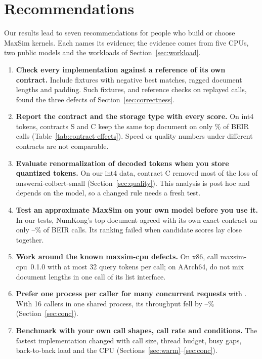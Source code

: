 \section{Recommendations}
\label{sec:recs}

Our results lead to seven recommendations for people who build or choose MaxSim kernels.
Each names its evidence; the evidence comes from five CPUs, two public models and the workloads of Section~\ref{sec:workload}.

\begin{enumerate}
\item \textbf{Check every implementation against a reference of its own contract.} Include fixtures with negative best matches, ragged document lengths and padding. Such fixtures, and reference checks on replayed calls, found the three defects of Section~\ref{sec:correctness}.
\item \textbf{Report the contract and the storage type with every score.} On int4 tokens, contracts S and C keep the same top document on only \% of BEIR calls (Table~\ref{tab:contract-effects}). Speed or quality numbers under different contracts are not comparable.
\item \textbf{Evaluate renormalization of decoded tokens when you store quantized tokens.} On our int4 data, contract C removed most of the loss of answerai-colbert-small (Section~\ref{sec:quality}). This analysis is post hoc and depends on the model, so a changed rule needs a fresh test.
\item \textbf{Test an approximate MaxSim on your own model before you use it.} In our tests, NumKong's top document agreed with its own exact contract on only --\% of BEIR calls. Its ranking failed when candidate scores lay close together.
\item \textbf{Work around the known maxsim-cpu defects.} On x86, call maxsim-cpu~0.1.0 with at most 32 query tokens per call; on AArch64, do not mix document lengths in one call of its list interface.
\item \textbf{Prefer one process per caller for many concurrent requests} with \sweet. With 16 callers in one shared process, its throughput fell by --\% (Section~\ref{sec:conc}).
\item \textbf{Benchmark with your own call shapes, call rate and conditions.} The fastest implementation changed with call size, thread budget, busy gaps, back-to-back load and the CPU (Sections~\ref{sec:warm}--\ref{sec:conc}).
\end{enumerate}
